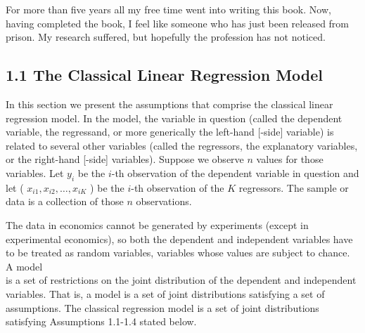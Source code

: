 \documentclass[10pt]{article}
\begin{document}
For more than five years all my free time went into writing this book. Now, having completed the book, I feel like someone who has just been released from prison. My research suffered, but hopefully the profession has not noticed.

\begin{abstract}
The Ordinary Least Squares (OLS) estimator is the most basic estimation procedure in econometrics. This chapter covers the finite- or small-sample properties of the OLS estimator, that is, the statistical properties of the OLS estimator that are valid for any given sample size. The materials covered in this chapter are entirely standard. The exposition here differs from that of most other textbooks in its emphasis on the role played by the assumption that the regressors are "strictly exogenous."\\
In the final section, we apply the finite-sample theory to the estimation of the cost function using cross-section data on individual firms. The question posed in Nerlove's (1963) study is of great practical importance: are there increasing returns to scale in electricity supply? If yes, microeconomics tells us that the industry should be regulated. Besides providing you with a hands-on experience of using the techniques to test interesting hypotheses, Nerlove's paper has a careful discussion of why the OLS is an appropriate estimation procedure in this particular application.
\end{abstract}

\subsection*{1.1 The Classical Linear Regression Model}
In this section we present the assumptions that comprise the classical linear regression model. In the model, the variable in question (called the dependent variable, the regressand, or more generically the left-hand [-side] variable) is related to several other variables (called the regressors, the explanatory variables, or the right-hand [-side] variables). Suppose we observe $n$ values for those variables. Let $y_{i}$ be the $i$-th observation of the dependent variable in question and let ( $x_{i 1}, x_{i 2}, \ldots, x_{i K}$ ) be the $i$-th observation of the $K$ regressors. The sample or data is a collection of those $n$ observations.

The data in economics cannot be generated by experiments (except in experimental economics), so both the dependent and independent variables have to be treated as random variables, variables whose values are subject to chance. A model\\
is a set of restrictions on the joint distribution of the dependent and independent variables. That is, a model is a set of joint distributions satisfying a set of assumptions. The classical regression model is a set of joint distributions satisfying Assumptions 1.1-1.4 stated below.
\end{document}
